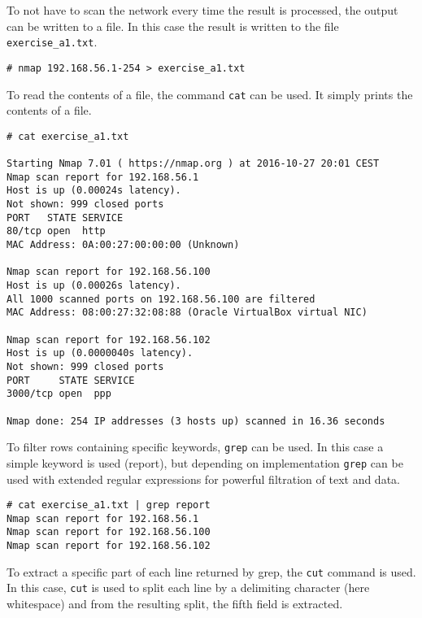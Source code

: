 To not have to scan the network every time the result is processed,
the output can be written to a file. In this case the result is written
to the file \texttt{exercise\_a1.txt}.

\begin{lstlisting}[numbers=none, language={}, frame=single, framexleftmargin={0.2em}]
# nmap 192.168.56.1-254 > exercise_a1.txt
\end{lstlisting}

\pagebreak
To read the contents of a file, the command \texttt{cat} can be used.
It simply prints the contents of a file.

\begin{lstlisting}[numbers=none, language={}, frame=single, framexleftmargin={0.2em}]
# cat exercise_a1.txt

Starting Nmap 7.01 ( https://nmap.org ) at 2016-10-27 20:01 CEST
Nmap scan report for 192.168.56.1
Host is up (0.00024s latency).
Not shown: 999 closed ports
PORT   STATE SERVICE
80/tcp open  http
MAC Address: 0A:00:27:00:00:00 (Unknown)

Nmap scan report for 192.168.56.100
Host is up (0.00026s latency).
All 1000 scanned ports on 192.168.56.100 are filtered
MAC Address: 08:00:27:32:08:88 (Oracle VirtualBox virtual NIC)

Nmap scan report for 192.168.56.102
Host is up (0.0000040s latency).
Not shown: 999 closed ports
PORT     STATE SERVICE
3000/tcp open  ppp

Nmap done: 254 IP addresses (3 hosts up) scanned in 16.36 seconds
\end{lstlisting}

To filter rows containing specific keywords, \texttt{grep} can be used.
In this case a simple keyword is used (report), but depending on implementation
\texttt{grep} can be used with extended regular expressions for powerful
filtration of text and data.

\begin{lstlisting}[numbers=none, language={}, frame=single, framexleftmargin={0.2em}]
# cat exercise_a1.txt | grep report
Nmap scan report for 192.168.56.1
Nmap scan report for 192.168.56.100
Nmap scan report for 192.168.56.102
\end{lstlisting}

To extract a specific part of each line returned by grep, the
\texttt{cut} command is used. In this case, \texttt{cut} is used to split each
line by a delimiting character (here whitespace) and from the
resulting split, the fifth field is extracted.

